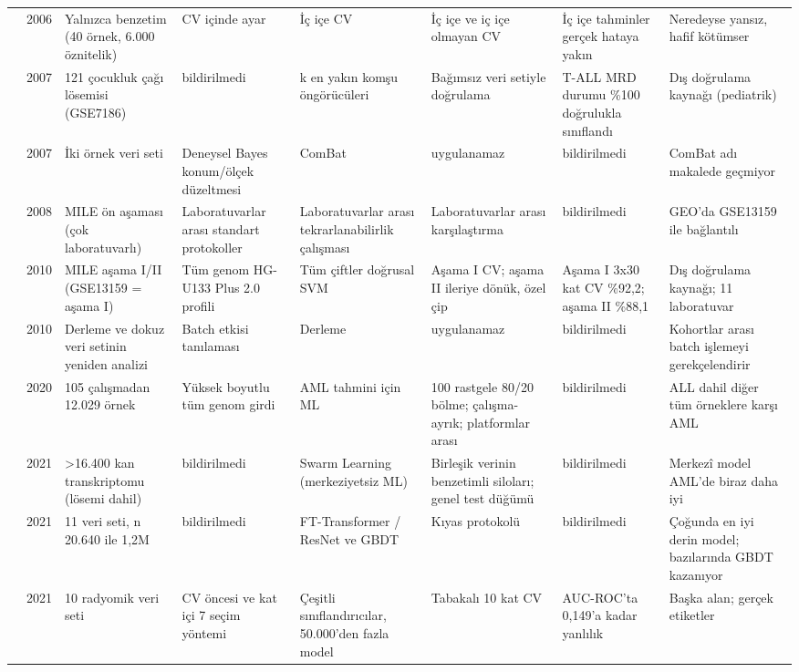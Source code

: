 \begin{longtable}{@{}p{0.9cm}p{0.5cm}p{2.3cm}p{2.6cm}p{2.6cm}p{2.3cm}p{2.6cm}p{2.4cm}@{}}
\cite{varma2006} & 2006 & Yalnızca benzetim (40 örnek, 6.000 öznitelik) & CV içinde ayar & İç içe CV & İç içe ve iç içe olmayan CV & İç içe tahminler gerçek hataya yakın & Neredeyse yansız, hafif kötümser\\
\cite{andersson2007} & 2007 & 121 çocukluk çağı lösemisi (GSE7186) & bildirilmedi & k en yakın komşu öngörücüleri & Bağımsız veri setiyle doğrulama & T-ALL MRD durumu \%100 doğrulukla sınıflandı & Dış doğrulama kaynağı (pediatrik)\\
\cite{johnson2007} & 2007 & İki örnek veri seti & Deneysel Bayes konum/ölçek düzeltmesi & ComBat & uygulanamaz & bildirilmedi & ComBat adı makalede geçmiyor\\
\cite{kohlmann2008} & 2008 & MILE ön aşaması (çok laboratuvarlı) & Laboratuvarlar arası standart protokoller & Laboratuvarlar arası tekrarlanabilirlik çalışması & Laboratuvarlar arası karşılaştırma & bildirilmedi & GEO'da GSE13159 ile bağlantılı\\
\cite{haferlach2010} & 2010 & MILE aşama I/II (GSE13159 = aşama I) & Tüm genom HG-U133 Plus 2.0 profili & Tüm çiftler doğrusal SVM & Aşama I CV; aşama II ileriye dönük, özel çip & Aşama I 3x30 kat CV \%92,2; aşama II \%88,1 & Dış doğrulama kaynağı; 11 laboratuvar\\
\cite{leek2010} & 2010 & Derleme ve dokuz veri setinin yeniden analizi & Batch etkisi tanılaması & Derleme & uygulanamaz & bildirilmedi & Kohortlar arası batch işlemeyi gerekçelendirir\\
\cite{warnatherresthal2020} & 2020 & 105 çalışmadan 12.029 örnek & Yüksek boyutlu tüm genom girdi & AML tahmini için ML & 100 rastgele 80/20 bölme; çalışma-ayrık; platformlar arası & bildirilmedi & ALL dahil diğer tüm örneklere karşı AML\\
\cite{warnatherresthal2021} & 2021 & >16.400 kan transkriptomu (lösemi dahil) & bildirilmedi & Swarm Learning (merkeziyetsiz ML) & Birleşik verinin benzetimli siloları; genel test düğümü & bildirilmedi & Merkezî model AML'de biraz daha iyi\\
\cite{gorishniy2021} & 2021 & 11 veri seti, n 20.640 ile 1,2M & bildirilmedi & FT-Transformer / ResNet ve GBDT & Kıyas protokolü & bildirilmedi & Çoğunda en iyi derin model; bazılarında GBDT kazanıyor\\
\cite{demircioglu2021} & 2021 & 10 radyomik veri seti & CV öncesi ve kat içi 7 seçim yöntemi & Çeşitli sınıflandırıcılar, 50.000'den fazla model & Tabakalı 10 kat CV & AUC-ROC'ta 0,149'a kadar yanlılık & Başka alan; gerçek etiketler\\

\end{longtable}
